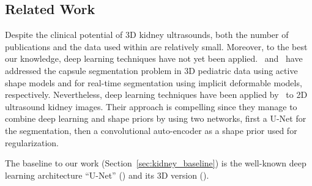 
\subsection{Related Work}


Despite the clinical potential of 3D kidney ultrasounds, both the number of publications and the data used within are relatively small. Moreover, to the best our knowledge, deep learning techniques have not yet been applied.~\textcite{cerrolaza2014ISBI} and~\textcite{marsousi2017} have addressed the capsule segmentation problem in 3D pediatric data using active shape models and for real-time segmentation using implicit deformable models, respectively. 
Nevertheless, deep learning techniques have been applied by~\textcite{ravishankar2017MICCAI} to 2D ultrasound kidney images. Their approach is compelling since they manage to combine deep learning and shape priors by using two networks, first a U-Net for the segmentation, then a convolutional auto-encoder as a shape prior used for regularization.

The baseline to our work (Section~\ref{sec:kidney_baseline}) is the well-known deep learning architecture ``U-Net'' (\textcite{ronneberger2015MICCAI}) and its 3D version (\textcite{cicek2016MICCAI}). 


